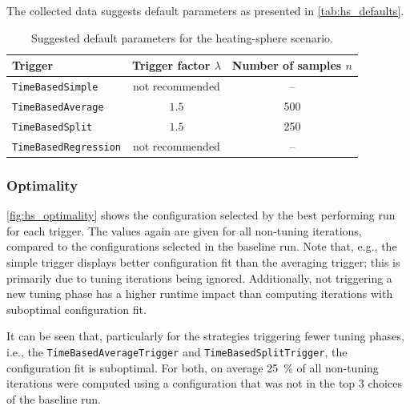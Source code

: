The collected data suggests default parameters as presented in \autoref{tab:hs_defaults}.
\begin{table}[htpb]
	\centering
	\begin{tabular}{lcc}
		\toprule
		\textbf{Trigger}             & \textbf{Trigger factor $\lambda$} & \textbf{Number of samples $n$} \\ [0em]
		\midrule
		\texttt{TimeBasedSimple}     & not recommended                   & --                             \\
		\texttt{TimeBasedAverage}    & $1.5$                             & 500                            \\
		\texttt{TimeBasedSplit}      & $1.5$                             & 250                            \\
		\texttt{TimeBasedRegression} & not recommended                   & --                             \\
		\bottomrule
	\end{tabular}
	\caption{Suggested default parameters for the heating-sphere scenario.}
	\label{tab:hs_defaults}
\end{table}



\subsubsection{Optimality}
\autoref{fig:hs_optimality} shows the configuration selected by the best performing run for each trigger. The values again are given for all non-tuning iterations, compared to the configurations selected in the baseline run. Note that, e.g., the simple trigger displays better configuration fit than the averaging trigger; this is primarily due to tuning iterations being ignored. Additionally, not triggering a new tuning phase has a higher runtime impact than computing iterations with suboptimal configuration fit.

It can be seen that, particularly for the strategies triggering fewer tuning phases, i.e., the \texttt{TimeBasedAverageTrigger} and \texttt{TimeBasedSplitTrigger}, the configuration fit is suboptimal. For both, on average \qty{25}{\percent} of all non-tuning iterations were computed using a configuration that was not in the top 3 choices of the baseline run.

